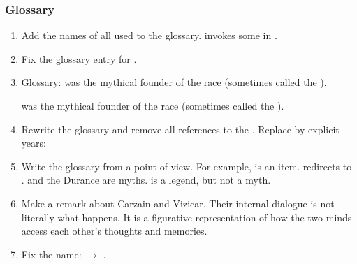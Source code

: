 \subsubsection{Glossary}
\begin{enumerate}
  \item 
    Add the names of all \xss{} used to the glossary. 
    \Ishnaruchaefir{} invokes some in . 
    
  \item 
    Fix the glossary entry for . 
  
  \item 
    Glossary: 
    \Sethicus was the mythical founder of the \draconian race (sometimes called the ).
    
    \Thanatzil was the mythical founder of the \resphan race (sometimes called the ).
    
  \item 
    Rewrite the glossary and remove all references to the . 
    Replace by explicit years:
  
  \item 
    Write the glossary from a \resphan point of view. 
    For example,  is an item.
    \quo{\Secondbanewar} redirects to .
    \Sethicus and the Durance are myths.
    \Thanatzil is a legend, but not a myth.
  
  \item 
    Make a remark about Carzain and Vizicar.
    Their internal dialogue is not literally what happens.
    It is a figurative representation of how the two minds access each other's thoughts and memories. 
  
  \item 
    Fix the name: 
    \Rystessakhin{} $\to$ \AeocrithRystessakhin. 
\end{enumerate}





